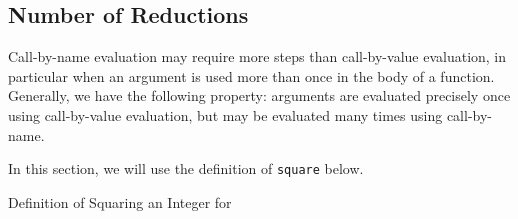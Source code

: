 \subsection{Number of Reductions}\label{subsec:Number_of_Reductions}
Call-by-name evaluation may require more steps than call-by-value evaluation, in particular when an argument is used more than once in the body of a function.
Generally, we have the following property: arguments are evaluated precisely once using call-by-value evaluation, but may be evaluated many times using call-by-name.

In this section, we will use the definition of \texttt{square} below.
\begin{listing}[h!tbp]
\caption{Definition of Squaring an Integer for }
\label{lst:Square_Definition}
\end{listing}



